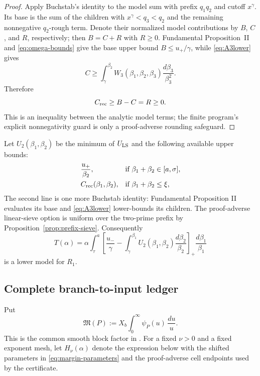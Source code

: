 \documentclass[10pt,reqno]{amsart}
\newcommand{\1}{\mathbf{1}}
\theoremstyle{plain}
\theoremstyle{remark}
\begin{document}
\begin{proof}
Apply Buchstab's identity to the model sum with prefix $q_1q_2$ and cutoff
$x^\gamma$.  Its base is the sum of the children with
$x^\gamma<q_3<q_2$ and the remaining nonnegative $q_2$-rough term.  Denote
their normalized model contributions by $B$, $C$, and $R$, respectively;
then $B=C+R$ with $R\ge0$.  Fundamental Proposition~II and
\eqref{eq:omega-bounds} give the base upper bound
$B\le u_+/\gamma$, while \eqref{eq:A3lower} gives
\[
 C\ge\int_\gamma^{\beta_2}
 W_3(\beta_1,\beta_2,\beta_3)\frac{d\beta_3}{\beta_3^2}.
\]
Therefore
\[
 C_{\rm rec}\ge B-C=R\ge0.
\]
This is an inequality between the analytic model terms; the finite program's
explicit nonnegativity guard is only a proof-adverse rounding safeguard.
\end{proof}

Let $U_2(\beta_1,\beta_2)$ be the minimum of $U_{\rm LS}$ and the following
available upper bounds:
\begin{align*}
 &\frac{u_+}{\beta_2},
 &&\text{if }\beta_1+\beta_2\in[a,\sigma],\\
 &C_{\rm rec}(\beta_1,\beta_2),
 &&\text{if }\beta_1+\beta_2\le\xi,
\end{align*}
The second line is one more Buchstab identity: Fundamental Proposition II
evaluates its base and \eqref{eq:A3lower} lower-bounds its children.
The proof-adverse linear-sieve option is uniform over the two-prime prefix
by Proposition~\ref{prop:prefix-sieve}.
Consequently
\begin{equation}\label{eq:Tlower}
 T(\alpha)=\alpha\int_\tau^a
 \left[\frac{u_-}{\gamma}
 -\int_\gamma^{\beta_1}U_2(\beta_1,\beta_2)
       \frac{d\beta_2}{\beta_2}\right]_+
 \frac{d\beta_1}{\beta_1}
\end{equation}
is a lower model for $R_1$.

\subsection{Complete branch-to-input ledger}

Put
\[
 \mathfrak M(P):=X_b\int_0^\infty\psi_P(u)\,\frac{du}{u}.
\]
This is the common smooth block factor in
\cite[Lemma 7]{Merikoski2020}.  For a fixed $\nu>0$ and a fixed exponent
mesh, let $H_\nu(\alpha)$ denote the expression below with the shifted
parameters in \eqref{eq:margin-parameters} and the proof-adverse cell
endpoints used by the certificate.
\end{document}
